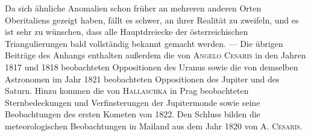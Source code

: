 Da sich ähnliche Anomalien schon früher an mehreren anderen Orten Oberitaliens gezeigt haben, fällt es schwer, an ihrer Realität zu zweifeln, und es ist sehr zu wünschen, dass alle Hauptdreiecke der österreichischen Triangulierungen bald vollständig bekannt gemacht werden. --- Die übrigen Beiträge des Anhangs enthalten außerdem die von \textsc{Angelo Cesaris} in den Jahren 1817 und 1818 beobachteten Oppositionen des Uranus sowie die von demselben Astronomen im Jahr 1821 beobachteten Oppositionen des Jupiter und des Saturn. Hinzu kommen die von \textsc{Hallaschka} in Prag beobachteten Sternbedeckungen und Verfinsterungen der Jupitermonde sowie seine Beobachtungen des ersten Kometen von 1822. Den Schluss bilden die meteorologischen Beobachtungen in Mailand aus dem Jahr 1820 von A. \textsc{Cesaris}.
